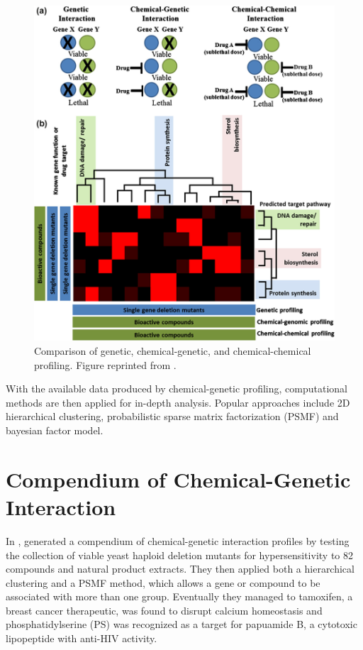 \documentclass[12pt,conference,compsocconf]{../IEEEtran}
\begin{document}
\begin{figure}
\centering
\includegraphics[width=\linewidth]{1082-1.png}
\caption{Comparison of genetic, chemical-genetic, and chemical-chemical profiling. Figure reprinted from \citep{1082}.}
\label{fig:1082-1}
\end{figure}

With the available data produced by chemical-genetic profiling, computational methods are then applied for in-depth analysis. Popular approaches include 2D hierarchical clustering, probabilistic sparse matrix factorization (PSMF) and bayesian factor model. 

\section{Compendium of Chemical-Genetic Interaction}

In \citeyear{1078},  generated a compendium of chemical-genetic interaction profiles by testing the collection of viable yeast haploid deletion mutants for hypersensitivity to 82 compounds and natural product extracts. They then applied both a hierarchical clustering and a PSMF method, which allows a gene or compound to be associated with more than one group. Eventually they managed to  tamoxifen, a breast cancer therapeutic, was found to disrupt calcium homeostasis and phosphatidylserine (PS) was recognized as a target for papuamide B, a cytotoxic lipopeptide with anti-HIV activity. \citep{1078}
\end{document}
